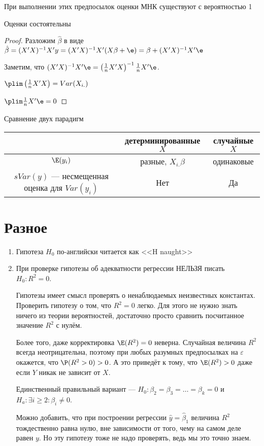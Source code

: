 \documentclass[pdftex,12pt,a4paper]{article}
\def \hb{\hat{\beta}}
\def \hy{\hat{y}}
\begin{document}
При выполнении этих предпосылок оценки МНК существуют с вероятностью 1 

Оценки состоятельны
\begin{proof}
Разложим $\hb$ в виде $\hb=(X'X)^{-1}X'y=(X'X)^{-1}X'(X\beta+\e)=\beta+(X'X)^{-1}X'\e$

Заметим, что $(X'X)^{-1}X'\e=\left(\frac{1}{n}X'X\right)^{-1}\frac{1}{n}X'\e$.

$\plim \left(\frac{1}{n}X'X\right)=Var(X_{i.})$

$\plim \frac{1}{n}X'\e=0$
\end{proof}




Сравнение двух парадигм

\begin{tabular}{c|cc}
 & детерминированные $X$  & случайные $X$ \\ 
\hline 
$\E(y_i)$ & разные, $X_{i.}\beta$ & одинаковые \\ 
$sVar(y)$ --- несмещенная оценка для $Var(y_i)$ & Нет & Да \\
 
\end{tabular} 

\section{Разное}
\begin{enumerate}

\item Гипотеза $H_0$ по-английски читается как <<H naught>>
\item При проверке гипотезы об адекватности регрессии НЕЛЬЗЯ писать $H_0: R^2=0$. 


Гипотезы имеет смысл проверять о ненаблюдаемых неизвестных константах. 
Проверить гипотезу о том, что $R^2=0$ легко. 
Для этого не нужно знать ничего из теории вероятностей, достаточно просто сравнить посчитанное значение $R^2$ с нулём. 

Более того, даже корректировка $\E(R^2)=0$ неверна. 
Случайная величина $R^2$ всегда неотрицательна, поэтому при любых разумных предпосылках на $\varepsilon$ окажется, что $\P(R^2>0)>0$. 
А это приведёт к тому, что $\E(R^2)>0$ даже если $Y$ никак не зависит от $X$.


Единственный правильный вариант --- $H_0: \beta_2=\beta_3=\ldots=\beta_k=0$ и $H_a: \exists i\geq 2 : \beta_i\neq 0$.

Можно добавить, что при построении регрессии $\hy=\hb_1$ величина $R^2$ тождественно равна нулю, вне зависимости от того, чему на самом деле равен $y$. Но эту гипотезу тоже не надо проверять, ведь мы это точно знаем.
\end{enumerate}
\end{document}
